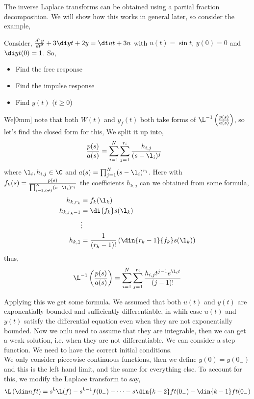 The inverse Laplace transforms can be obtained using a partial fraction decomposition. We will show how this works in general later, so consider the example,

\begin{eg}
  Consider, $\frac{d^2 y}{dt^2} + 3\di y t + 2y = \di u t + 3u$ with $u(t) = \sin t$, $y(0) = 0$ and $\di y t (0) = 1$. So,
  \begin{itemize}
    \item Find the free response
    \item Find the impulse response
    \item Find $y(t)$ ($t \ge 0$)
  \end{itemize}
\end{eg}

We[0mm] note that both $W(t)$ and $y_f(t)$ both take forms of $\L^{-1}\left( \frac{p (s)}{a (s)} \right)$, so let's find the closed form for this,
We split it up into,
\begin{align*}
  \frac{p(s)}{a(s)} &= \sum_{i=1}^N \sum^{r_i}_{j = 1} \frac{h_{i, j}}{(s - \l_i)^j}
\end{align*}
where $\l_i, h_{i,j} \in \C$ and $a(s) = \prod_{j=1}^N (s - \l_i)^{r_i}$. Here with $f_k (s) = \frac{p(s)}{\prod_{i=1, i \ne j}^N (s - \l_i)^{r_i}}$ the coefficients $h_{k, j}$ can we obtained from some formula,
\begin{align*}
  h_{k, r_k} &= f_k (\l_k)\\
  h_{k, r_k-1} &= \di {f_k} s (\l_k)\\
  &\vdots\\
  h_{k, 1} &= \frac{1}{(r_k-1)!}\left( \din {r_k-1} {f_k} s (\l_k) \right)
\end{align*}
thus,
$$ \L^{-1} \left( \frac{p(s)}{a(s)}\right) = \sum_{i=1}^N \sum_{j = 1}^{r_i} \frac{h_{i,j}t^{j-1}e^{\l_i t}}{(j - 1)!}$$

Applying this we get some formula. We assumed that both $u(t)$ and $y(t)$ are exponentially bounded and sufficiently differentiable, in whih case $u(t)$ and $y(t)$ satisfy the differential equation even when they are not exponentially bounded. Now we onlu need to assume that they are integrable, then we can get a weak solution, i.e. when they are not differentiable. We can consider a step function. We need to have the correct initial conditions.\\

We only consider piecewise continuous functions, then we define $y(0) = y(0_-)$ and this is the left hand limit, and the same for everything else. To account for this, we modify the Laplace transform to say,
$$ \L\left(\din n f t \right) = s^k \L(f) - s^{k-1}f(0_-) - \dots - s\din {k-2} f t (0_-) - \din {k-1} f t (0_-) $$

